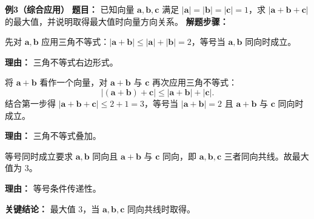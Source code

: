 \begin{examplebox}
	\medskip
	\textbf{\textcolor{CExample}{例3（综合应用）}}
	\textbf{\textcolor{CExample}{题目：}}
	已知向量 $\mathbf{a},\mathbf{b},\mathbf{c}$ 满足 $|\mathbf{a}|=|\mathbf{b}|=|\mathbf{c}|=1$，求 $|\mathbf{a}+\mathbf{b}+\mathbf{c}|$ 的最大值，并说明取得最大值时向量方向关系。
	\textbf{\textcolor{CExample}{解题步骤：}}
	\begin{description}[style=nextline, leftmargin=2.8em, labelsep=0.5em, itemsep=0.45em]
		\item[\textbf{第一步（两向量求和）}]
			先对 $\mathbf{a},\mathbf{b}$ 应用三角不等式：$|\mathbf{a}+\mathbf{b}| \le |\mathbf{a}|+|\mathbf{b}| = 2$，等号当 $\mathbf{a},\mathbf{b}$ 同向时成立。
			\par\textbf{理由：} 三角不等式右边形式。
		\item[\textbf{第二步（再与第三向量和）}]
			将 $\mathbf{a}+\mathbf{b}$ 看作一个向量，对 $\mathbf{a}+\mathbf{b}$ 与 $\mathbf{c}$ 再次应用三角不等式：
			\[
				|(\mathbf{a}+\mathbf{b})+\mathbf{c}| \le |\mathbf{a}+\mathbf{b}| + |\mathbf{c}|.
			\]
			结合第一步得 $|\mathbf{a}+\mathbf{b}+\mathbf{c}| \le 2 + 1 = 3$，等号当 $|\mathbf{a}+\mathbf{b}|=2$ 且 $\mathbf{a}+\mathbf{b}$ 与 $\mathbf{c}$ 同向时成立。
			\par\textbf{理由：} 三角不等式叠加。
		\item[\textbf{第三步（等号传递整合）}]
			等号同时成立要求 $\mathbf{a},\mathbf{b}$ 同向且 $\mathbf{a}+\mathbf{b}$ 与 $\mathbf{c}$ 同向，即 $\mathbf{a},\mathbf{b},\mathbf{c}$ 三者同向共线。故最大值为 $3$。
			\par\textbf{理由：} 等号条件传递性。
	\end{description}
	\textbf{\textcolor{CExample}{关键结论：}}
	最大值 $3$，当 $\mathbf{a},\mathbf{b},\mathbf{c}$ 同向共线时取得。
\end{examplebox}
